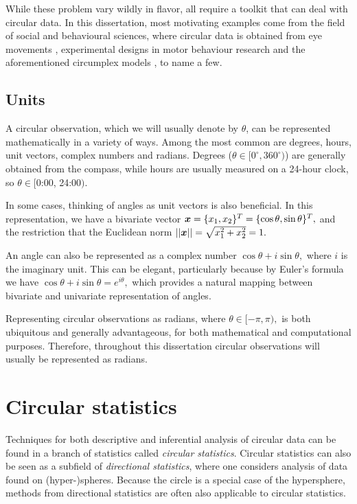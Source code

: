\documentclass[12pt, a4paper]{book}\usepackage[]{graphicx}\usepackage[]{color}
\begin{document}
 While these problem vary wildly in flavor, all require a toolkit that can deal with circular data. In this dissertation, most motivating examples come from the field of social and behavioural sciences, where circular data is obtained from eye movements \citep{tatler2009prominence}, experimental designs in  motor behaviour research \citep{mechsner2001perceptual, kaas2006haptic, mechsner2007bimanual, postma2008keep} and the aforementioned circumplex models \citep{Leary1957, gurtman2003circumplex,  gurtman2009exploring}, to name a few.


\subsection*{Units}

A circular observation, which we will usually denote by $\theta$, can be represented mathematically in a variety of ways. Among the most common are degrees, hours, unit vectors, complex numbers and radians. Degrees ($\theta \in [0^\circ, 360^\circ)$) are generally obtained from the compass, while hours are usually measured on a 24-hour clock, so $\theta \in [$0:00, 24:00$)$.

In some cases, thinking of angles as unit vectors is also beneficial. In this representation, we have a bivariate vector $\boldsymbol{x} = \{x_1, x_2\}^T = \{\cos\theta, \sin\theta\}^T,$ and the restriction that the Euclidean norm $\vert\vert \boldsymbol{x} \vert\vert = \sqrt{x_1^2 + x_2^2} = 1.$

An angle can also be represented as a complex number $\cos\theta + i \sin \theta,$ where $i$ is the imaginary unit. This can be elegant, particularly because by Euler's formula we have $\cos\theta + i \sin \theta = e^{i\theta},$ which provides a natural mapping between bivariate and univariate representation of angles.

Representing circular observations as radians, where $\theta \in [-\pi, \pi),$ is both ubiquitous and generally advantageous, for both mathematical and computational purposes. Therefore, throughout this dissertation circular observations will usually be represented as radians.


\section*{Circular statistics}

Techniques for both descriptive and inferential analysis of circular data can be found in a branch of statistics called \textit{circular statistics}. Circular statistics can also be seen as a subfield of \textit{directional statistics}, where one considers analysis of data found on (hyper-)spheres. Because the circle is a special case of the hypersphere, methods from directional statistics are often also applicable to circular statistics.
\end{document}
